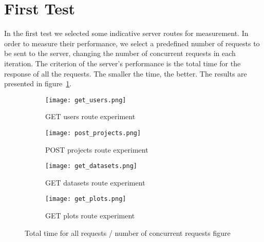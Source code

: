 \section{First Test}
In the first test we selected some indicative server routes for measurement. In order to measure their performance, we select a predefined number of requests to be sent to the server, changing the number of concurrent requests in each iteration. The criterion of the server's performance is the total time for the response of all the requests. The smaller the time, the better. The results are presented in figure~\ref{experiment_fig}. \par 
 
\begin{figure}
\centering
\begin{subfigure}{1\textwidth}
  \centering
  \centerline{\texttt{[image: get\_users.png]}}
  \caption{GET users route experiment}
\end{subfigure}
\begin{subfigure}{1\textwidth}
  \centering
  \centerline{\texttt{[image: post\_projects.png]}}
  \caption{POST projects route experiment}
\end{subfigure}
\begin{subfigure}{1\textwidth}
  \centering
  \centerline{\texttt{[image: get\_datasets.png]}}
  \caption{GET datasets route experiment}
\end{subfigure}
\begin{subfigure}{1\textwidth}
  \centering
  \centerline{\texttt{[image: get\_plots.png]}}
  \caption{GET plots route experiment}
\end{subfigure}
\caption{Total time for all requests / number of concurrent requests figure}
\label{experiment_fig}
\end{figure}


